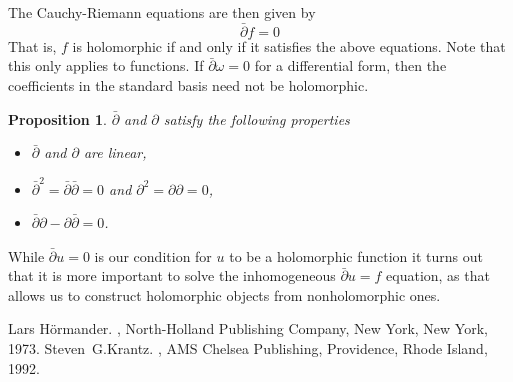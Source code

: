 \documentclass[12pt]{article}
\theoremstyle{theorem}
\newtheorem*{prop}{Proposition}
\theoremstyle{definition}
\theoremstyle{remark}
\begin{document}
The Cauchy-Riemann equations are then given by
\begin{equation*}
\bar{\partial} f = 0
\end{equation*}
That is, $f$ is holomorphic if and only if it satisfies the above equations.
Note that this only applies to functions.  If $\bar{\partial}\omega = 0$
for a differential form, then the coefficients in the standard basis
need not be holomorphic.

\begin{prop}
$\bar{\partial}$ and $\partial$ satisfy the following properties
\begin{itemize}
\item $\bar{\partial}$ and $\partial$ are linear,
\item $\bar{\partial}^2 = \bar{\partial} \bar{\partial} = 0$ and $\partial^2 = \partial \partial = 0$,
\item $\bar{\partial} \partial - \partial \bar{\partial} = 0$.
\end{itemize} 
\end{prop}

While $\bar{\partial} u = 0$ is our condition for $u$ to be a
holomorphic function it turns out that it is more important to solve the inhomogeneous
$\bar{\partial}u = f$ equation, as that allows us to construct holomorphic
objects from nonholomorphic ones.

\begin{thebibliography}{9}
Lars H\"ormander.
{\em {}},
North-Holland Publishing Company, New York, New York, 1973.
Steven~G.\@ Krantz.
{\em {}},
AMS Chelsea Publishing, Providence, Rhode Island, 1992.
\end{thebibliography}
\end{document}
